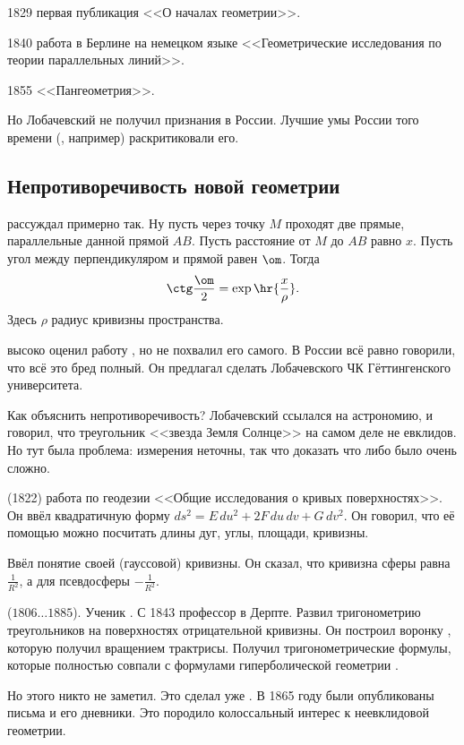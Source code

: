 \documentclass[a4paper,oneside,fleqn,10pt]{article}
\newcommand{\pe}[2]{${#1}\ldots{#2}$}
\begin{document}
1829 первая публикация <<О началах геометрии>>.

1840 работа в Берлине на немецком языке <<Геометрические исследования
по теории параллельных линий>>.

1855 <<Пангеометрия>>.

Но Лобачевский не получил признания в России.
Лучшие умы России того времени (, например)
раскритиковали его.

\subsection{Непротиворечивость новой геометрии}

 рассуждал примерно так.
Ну пусть через точку $M$ проходят две прямые, параллельные данной
прямой $AB$. Пусть расстояние от $M$ до $AB$ равно $x$.
Пусть угол между перпендикуляром и прямой равен $\om$.
Тогда
$$\ctg \frac{\om}{2} = \exp\hr{\frac{x}{\rho}}.$$
Здесь $\rho$ радиус кривизны пространства.

 высоко оценил работу , но не похвалил его самого.
В России всё равно говорили, что всё это бред полный.
Он предлагал сделать Лобачевского ЧК Гёттингенского университета.

Как объяснить непротиворечивость? Лобачевский ссылался на астрономию,
и говорил, что треугольник <<звезда Земля Солнце>> на самом деле
не евклидов. Но тут была проблема: измерения неточны, так что доказать
что либо было очень сложно.

 (1822) работа по геодезии <<Общие исследования о кривых поверхностях>>.
Он ввёл квадратичную форму $ds^2 = E\,du^2 + 2F\,du\,dv + G\, dv^2$.
Он говорил, что её помощью можно посчитать длины дуг, углы, площади, кривизны.

Ввёл понятие своей (гауссовой) кривизны. Он сказал, что кривизна сферы равна $\frac{1}{R^2}$,
а для псевдосферы $-\frac{1}{R^2}$.

 (\pe{1806}{1885}). Ученик .
С 1843 профессор в Дерпте. Развил тригонометрию треугольников
на поверхностях отрицательной кривизны. Он построил
воронку , которую получил вращением трактрисы.
Получил тригонометрические формулы, которые полностью совпали с формулами гиперболической
геометрии .

Но этого никто не заметил. Это сделал уже .
В 1865 году были опубликованы письма  и его дневники.
Это породило колоссальный интерес к неевклидовой геометрии.
\end{document}
